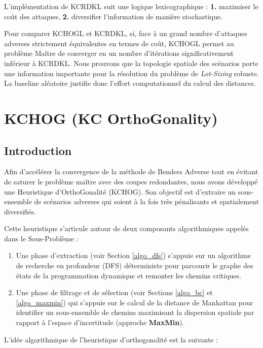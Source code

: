 \documentclass[11pt,a4paper]{article}
\begin{document}
L'implémentation de KCRDKL suit une logique lexicographique : \textbf{1.} maximiser le coût des attaques, \textbf{2.} diversifier l'information de manière stochastique. 

Pour comparer KCHOGL et KCRDKL, si, face à un grand nombre d'attaques adverses strictement équivalentes en termes de coût, KCHOGL permet au problème Maître de converger en un nombre d'itérations significativement inférieur à KCRDKL. Nous prouvons que la topologie spatiale des scénarios porte une information importante pour la résolution du problème de \textit{Lot-Sizing} robuste. La baseline aléatoire justifie donc l'effort computationnel du calcul des distances.

\newpage
\section{KCHOG (KC OrthoGonality)}
\label{hog}

\subsection{Introduction}

Afin d'accélérer la convergence de la méthode de Benders Adverse tout en évitant de saturer le problème maître avec des coupes redondantes, nous avons développé une Heuristique d'OrthoGonalité (KCHOG). Son objectif est d'extraire un sous-ensemble de scénarios adverses qui soient à la fois très pénalisants et spatialement diversifiés. 

Cette heuristique s'articule autour de deux composants algorithmiques appelés dans le Sous-Problème :

\begin{enumerate}
    \item Une phase d'extraction (voir Section \ref{algo_dfs}) s'appuie sur un algorithme de recherche en profondeur (DFS) déterministe pour parcourir le graphe des états de la programmation dynamique et remonter les chemins critiques.
    \item Une phase de filtrage et de sélection (voir Sections \ref{algo_bc} et \ref{algo_maxmin}) qui s'appuie sur le calcul de la distance de Manhattan pour identifier un sous-ensemble de chemins maximisant la dispersion spatiale par rapport à l'espace d'incertitude (approche \textbf{MaxMin}).
\end{enumerate}

L'idée algorithmique de l'heuristique d'orthogonalité est la suivante :
\end{document}
